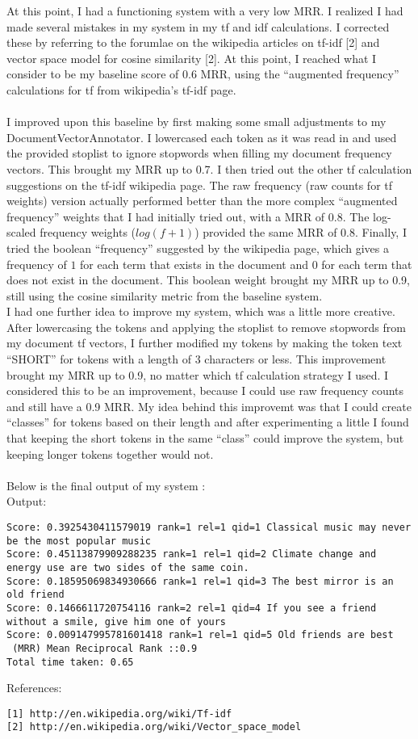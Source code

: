 \documentclass[11pt]{article}
\begin{document}
At this point, I had a functioning system with a very low MRR. I realized I had made several mistakes in my system in my tf and idf calculations. I corrected these by referring to the forumlae on the wikipedia articles on tf-idf [2] and vector space model for cosine similarity [2]. At this point, I reached what I consider to be my baseline score of 0.6 MRR, using the ``augmented frequency'' calculations for tf from wikipedia's tf-idf page. \\ \\
I improved upon this baseline by first making some small adjustments to my DocumentVectorAnnotator. I lowercased each token as it was read in and used the provided stoplist to ignore stopwords when filling my document frequency vectors. This brought my MRR up to 0.7. I then tried out the other tf calculation suggestions on the tf-idf wikipedia page. The raw frequency (raw counts for tf weights) version actually performed better than the more complex ``augmented frequency'' weights that I had initially tried out, with a MRR of 0.8. The log-scaled frequency weights ($log(f+1)$) provided the same MRR of 0.8. Finally, I tried the boolean ``frequency'' suggested by the wikipedia page, which gives a frequency of $1$ for each term that exists in the document and $0$ for each term that does not exist in the document. This boolean weight brought my MRR up to 0.9, still using the cosine similarity metric from the baseline system. \\ 
I had one further idea to improve my system, which was a little more creative. After lowercasing the tokens and applying the stoplist to remove stopwords from my document tf vectors, I further modified my tokens by making the token text ``SHORT'' for tokens with a length of 3 characters or less. This improvement brought my MRR up to 0.9, no matter which tf calculation strategy I used. I considered this to be an improvement, because I could use raw frequency counts and still have a 0.9 MRR. My idea behind this improvemt was that I could create ``classes'' for tokens based on their length and after experimenting a little I found that keeping the short tokens in the same ``class'' could improve the system, but keeping longer tokens together would not. \\ \\
Below is the final output of my system : \\

Output: \\
\begin{verbatim}
Score: 0.3925430411579019 rank=1 rel=1 qid=1 Classical music may never be the most popular music 
Score: 0.45113879909288235 rank=1 rel=1 qid=2 Climate change and energy use are two sides of the same coin. 
Score: 0.18595069834930666 rank=1 rel=1 qid=3 The best mirror is an old friend 
Score: 0.1466611720754116 rank=2 rel=1 qid=4 If you see a friend without a smile, give him one of yours 
Score: 0.009147995781601418 rank=1 rel=1 qid=5 Old friends are best 
 (MRR) Mean Reciprocal Rank ::0.9
Total time taken: 0.65
\end{verbatim}

References: \\
\begin{verbatim}
[1] http://en.wikipedia.org/wiki/Tf-idf
[2] http://en.wikipedia.org/wiki/Vector_space_model
\end{verbatim}
\end{document}

